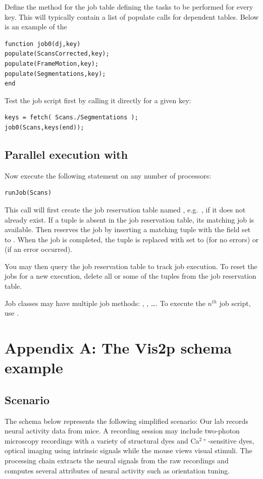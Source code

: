 \documentclass[10pt]{article}
\begin{document}
Define the method  for the job table defining the tasks to be performed for every key. This will typically contain a list of populate calls for dependent tables. Below is an example of the 
\begin{lstlisting}
function job0(dj,key)
populate(ScansCorrected,key);
populate(FrameMotion,key);
populate(Segmentations,key);
end
\end{lstlisting}

Test the job script first by calling it directly for a given key:
\begin{lstlisting}
keys = fetch( Scans./Segmentations );
job0(Scans,keys(end));
\end{lstlisting}

\subsection{Parallel execution with }
Now execute the following statement on any number of processors:
\begin{lstlisting}
runJob(Scans)
\end{lstlisting}
This call will first create the job reservation table named , e.g.~, if it does not already exist. If a tuple is absent in the job reservation table, its matching job is available.  
Then  reserves the job by inserting a matching tuple with the  field set to .  When the job is completed, the tuple is replaced with  set to  (for no errors) or  (if an error occurred).  

You may then query the job reservation table to track job execution. To reset the jobs for a new execution, delete all or some of the tuples from the job reservation table.

Job classes may have multiple job methods: , , \ldots.  To execute the $n^{th}$ job script, use .

\newpage\section{Appendix A: The Vis2p schema example}\label{sec:vis2p}
\subsection{Scenario}
The schema below represents the following simplified scenario: Our lab records neural activity data from mice. A recording session may include two-photon microscopy recordings with a variety of structural dyes and Ca$^{2+}$-sensitive dyes, optical imaging using intrinsic signals while the mouse views visual stimuli.  The processing chain extracts the neural signals from the raw recordings and computes several attributes of neural activity such as orientation tuning. 
\end{document}
